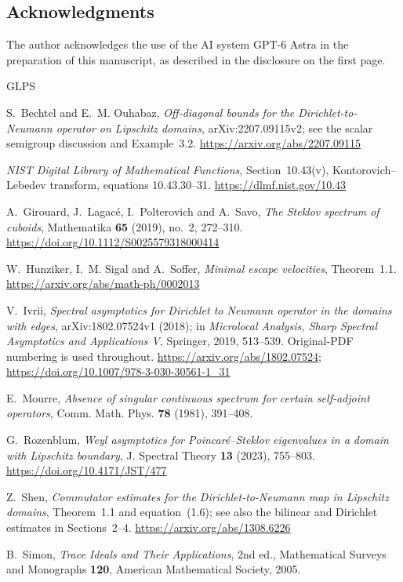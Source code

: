 \documentclass[11pt]{amsart}
\numberwithin{equation}{section}
\theoremstyle{remark}
\begin{document}
\subsection*{Acknowledgments}
The author acknowledges the use of the AI system GPT-6 Astra in the preparation of this manuscript, as described in the disclosure on the first page.

\begin{thebibliography}{GLPS}

S.~Bechtel and E.~M. Ouhabaz,
\emph{Off-diagonal bounds for the Dirichlet-to-Neumann operator on Lipschitz domains},
arXiv:2207.09115v2; see the scalar semigroup discussion and Example~3.2.
\url{https://arxiv.org/abs/2207.09115}

\emph{NIST Digital Library of Mathematical Functions}, Section~10.43(v), Kontorovich--Lebedev transform, equations 10.43.30--31.
\url{https://dlmf.nist.gov/10.43}

A.~Girouard, J.~Lagac\'e, I.~Polterovich and A.~Savo,
\emph{The Steklov spectrum of cuboids},
Mathematika \textbf{65} (2019), no.~2, 272--310.
\url{https://doi.org/10.1112/S0025579318000414}

W.~Hunziker, I.~M. Sigal and A.~Soffer,
\emph{Minimal escape velocities}, Theorem~1.1.
\url{https://arxiv.org/abs/math-ph/0002013}

V.~Ivrii,
\emph{Spectral asymptotics for Dirichlet to Neumann operator in the domains with edges},
arXiv:1802.07524v1 (2018); in \emph{Microlocal Analysis, Sharp Spectral Asymptotics and Applications V}, Springer, 2019, 513--539. Original-PDF numbering is used throughout.
\url{https://arxiv.org/abs/1802.07524};
\url{https://doi.org/10.1007/978-3-030-30561-1_31}

E.~Mourre,
\emph{Absence of singular continuous spectrum for certain self-adjoint operators},
Comm. Math. Phys. \textbf{78} (1981), 391--408.

G.~Rozenblum,
\emph{Weyl asymptotics for Poincar\'e--Steklov eigenvalues in a domain with Lipschitz boundary},
J. Spectral Theory \textbf{13} (2023), 755--803.
\url{https://doi.org/10.4171/JST/477}

Z.~Shen,
\emph{Commutator estimates for the Dirichlet-to-Neumann map in Lipschitz domains},
Theorem~1.1 and equation~(1.6); see also the bilinear and Dirichlet estimates in Sections~2--4.
\url{https://arxiv.org/abs/1308.6226}

B.~Simon,
\emph{Trace Ideals and Their Applications}, 2nd ed.,
Mathematical Surveys and Monographs \textbf{120}, American Mathematical Society, 2005.

\end{thebibliography}
\end{document}
